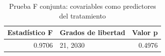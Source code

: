 
\begin{longtable}[t]{rlr}
\caption{Prueba F conjunta: covariables como predictores del tratamiento}\\
\toprule
Estadístico F & Grados de libertad & Valor p\\
\midrule
0.9706 & 21, 2030 & 0.4976\\
\bottomrule
\end{longtable}
